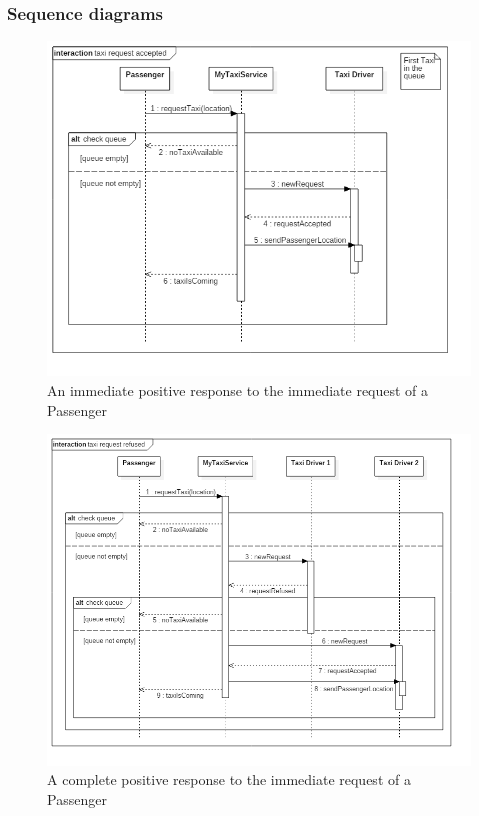 \subsubsection{Sequence diagrams}
\begin{figure}[H]
\centering
\includegraphics[scale=0.6]{Images/sequence_taxi_request_accepted}
\caption{An immediate positive response to the immediate request of a Passenger}
\label{request_positive_TaxiSD}
\end{figure}

\begin{figure}[H]
\centering
\includegraphics[scale=0.5]{Images/sequence_taxi_request_refused}
\caption{A complete positive response to the immediate request of a Passenger}
\label{request_negative_TaxiSD}
\end{figure}

